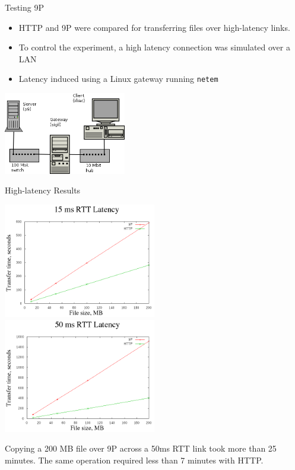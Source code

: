 \documentclass[11pt,compress]{beamer}
\begin{document}
\begin{frame}{Testing 9P}
\begin{itemize}
	\item HTTP and 9P were compared for transferring files over high-latency links.
	\item To control the experiment, a high latency connection was simulated over a LAN
	\item Latency induced using a Linux gateway running {\tt netem}
\end{itemize}
\begin{center}
	\includegraphics[width=0.40\textwidth]{network.png}
\end{center}
\end{frame}

\begin{frame}{High-latency Results}
\begin{center}
\includegraphics[width=0.5\textwidth]{15ms.png}
\includegraphics[width=0.5\textwidth]{50ms.png}
\end{center}
Copying a 200 MB file over 9P across a 50ms RTT link took more than 25 minutes. The same operation required less than 7 minutes with HTTP.
\end{frame}
\end{document}

